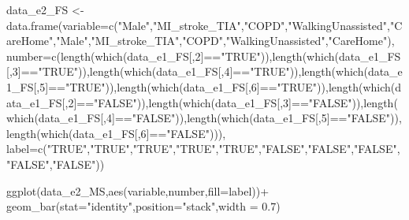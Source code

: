 \documentclass[
]{article}
\newenvironment{Shaded}{\begin{snugshade}}{\end{snugshade}}
\newcommand{\AttributeTok}[1]{\textcolor[rgb]{0.77,0.63,0.00}{#1}}
\newcommand{\DecValTok}[1]{\textcolor[rgb]{0.00,0.00,0.81}{#1}}
\newcommand{\FloatTok}[1]{\textcolor[rgb]{0.00,0.00,0.81}{#1}}
\newcommand{\FunctionTok}[1]{\textcolor[rgb]{0.00,0.00,0.00}{#1}}
\newcommand{\NormalTok}[1]{#1}
\newcommand{\OtherTok}[1]{\textcolor[rgb]{0.56,0.35,0.01}{#1}}
\newcommand{\SpecialCharTok}[1]{\textcolor[rgb]{0.00,0.00,0.00}{#1}}
\newcommand{\StringTok}[1]{\textcolor[rgb]{0.31,0.60,0.02}{#1}}
\begin{document}
\begin{Shaded}
\begin{Highlighting}[]
\NormalTok{data\_e2\_FS }\OtherTok{\textless{}{-}} \FunctionTok{data.frame}\NormalTok{(}\AttributeTok{variable=}\FunctionTok{c}\NormalTok{(}\StringTok{"Male"}\NormalTok{,}\StringTok{"MI\_stroke\_TIA"}\NormalTok{,}\StringTok{"COPD"}\NormalTok{,}\StringTok{"WalkingUnassisted"}\NormalTok{,}\StringTok{"CareHome"}\NormalTok{,}\StringTok{"Male"}\NormalTok{,}\StringTok{"MI\_stroke\_TIA"}\NormalTok{,}\StringTok{"COPD"}\NormalTok{,}\StringTok{"WalkingUnassisted"}\NormalTok{,}\StringTok{"CareHome"}\NormalTok{),}
                        \AttributeTok{number=}\FunctionTok{c}\NormalTok{(}\FunctionTok{length}\NormalTok{(}\FunctionTok{which}\NormalTok{(data\_e1\_FS[,}\DecValTok{2}\NormalTok{]}\SpecialCharTok{==}\StringTok{"TRUE"}\NormalTok{)),}\FunctionTok{length}\NormalTok{(}\FunctionTok{which}\NormalTok{(data\_e1\_FS[,}\DecValTok{3}\NormalTok{]}\SpecialCharTok{==}\StringTok{"TRUE"}\NormalTok{)),}\FunctionTok{length}\NormalTok{(}\FunctionTok{which}\NormalTok{(data\_e1\_FS[,}\DecValTok{4}\NormalTok{]}\SpecialCharTok{==}\StringTok{"TRUE"}\NormalTok{)),}\FunctionTok{length}\NormalTok{(}\FunctionTok{which}\NormalTok{(data\_e1\_FS[,}\DecValTok{5}\NormalTok{]}\SpecialCharTok{==}\StringTok{"TRUE"}\NormalTok{)),}\FunctionTok{length}\NormalTok{(}\FunctionTok{which}\NormalTok{(data\_e1\_FS[,}\DecValTok{6}\NormalTok{]}\SpecialCharTok{==}\StringTok{"TRUE"}\NormalTok{)),}\FunctionTok{length}\NormalTok{(}\FunctionTok{which}\NormalTok{(data\_e1\_FS[,}\DecValTok{2}\NormalTok{]}\SpecialCharTok{==}\StringTok{"FALSE"}\NormalTok{)),}\FunctionTok{length}\NormalTok{(}\FunctionTok{which}\NormalTok{(data\_e1\_FS[,}\DecValTok{3}\NormalTok{]}\SpecialCharTok{==}\StringTok{"FALSE"}\NormalTok{)),}\FunctionTok{length}\NormalTok{(}\FunctionTok{which}\NormalTok{(data\_e1\_FS[,}\DecValTok{4}\NormalTok{]}\SpecialCharTok{==}\StringTok{"FALSE"}\NormalTok{)),}\FunctionTok{length}\NormalTok{(}\FunctionTok{which}\NormalTok{(data\_e1\_FS[,}\DecValTok{5}\NormalTok{]}\SpecialCharTok{==}\StringTok{"FALSE"}\NormalTok{)),}\FunctionTok{length}\NormalTok{(}\FunctionTok{which}\NormalTok{(data\_e1\_FS[,}\DecValTok{6}\NormalTok{]}\SpecialCharTok{==}\StringTok{"FALSE"}\NormalTok{))),}
                        \AttributeTok{label=}\FunctionTok{c}\NormalTok{(}\StringTok{"TRUE"}\NormalTok{,}\StringTok{"TRUE"}\NormalTok{,}\StringTok{"TRUE"}\NormalTok{,}\StringTok{"TRUE"}\NormalTok{,}\StringTok{"TRUE"}\NormalTok{,}\StringTok{"FALSE"}\NormalTok{,}\StringTok{"FALSE"}\NormalTok{,}\StringTok{"FALSE"}\NormalTok{,}\StringTok{"FALSE"}\NormalTok{,}\StringTok{"FALSE"}\NormalTok{))}

\FunctionTok{ggplot}\NormalTok{(data\_e2\_MS,}\FunctionTok{aes}\NormalTok{(variable,number,}\AttributeTok{fill=}\NormalTok{label))}\SpecialCharTok{+}
  \FunctionTok{geom\_bar}\NormalTok{(}\AttributeTok{stat=}\StringTok{"identity"}\NormalTok{,}\AttributeTok{position=}\StringTok{"stack"}\NormalTok{,}\AttributeTok{width =} \FloatTok{0.7}\NormalTok{)}
\end{Highlighting}
\end{Shaded}
\end{document}
